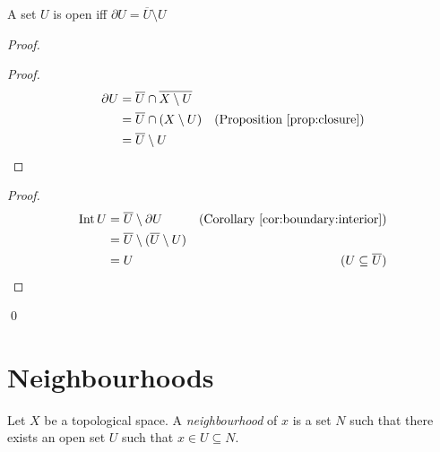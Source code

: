\begin{prop}
  A set $U$ is open iff $\partial U = \overline{U} \setminus U$
\end{prop}

\begin{proof}
  \pf
  \begin{proof}
    \pf
    \begin{align*}
      \partial U & = \overline{U} \cap \overline{X \setminus U} \\
      & = \overline{U} \cap (X \setminus U) & (\text{Proposition \ref{prop:closure}})\\
      & = \overline{U} \setminus U
    \end{align*}
  \end{proof}
  \begin{proof}
    \pf
    \begin{align*}
      \operatorname{Int} U & = \overline{U} \setminus \partial U & (\text{Corollary \ref{cor:boundary:interior}})\\
      & = \overline{U} \setminus (\overline{U} \setminus U) \\
      & = U & (U \subseteq \overline{U})
    \end{align*}
  \end{proof}
  \qed
\end{proof}

\section{Neighbourhoods}

\begin{df}[Neighbourhood]
  Let $X$ be a topological space. A \emph{neighbourhood} of $x$ is a set $N$ such that there exists an open set $U$ such that $x \in U \subseteq N$.
\end{df}

